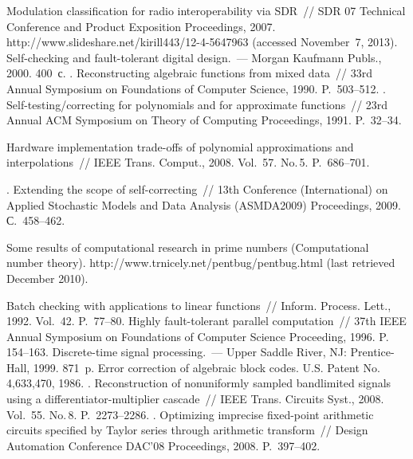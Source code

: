   \begin{multicols}{2}

\renewcommand{\bibname}{\protect\rmfamily Литература}

{\small\frenchspacing
{%
\begin{thebibliography}{99}

Modulation classification for radio interoperability via SDR~// {SDR 07 Technical Conference and Product Exposition 
Proceedings},  2007. {\sf http://www.slideshare.net/kirill443/12-4-5647963} (accessed November~7, 2013).
 Self-checking and fault-tolerant digital design.~--- Morgan Kaufmann Publs., 2000.
400~с.
.  Reconstructing algebraic functions from mixed data~// {33rd Annual 
Symposium on Foundations of Computer Science}, 1990. P.~503--512.
.
Self-testing/correcting for polynomials and for approximate functions~// {23rd Annual ACM Symposium on Theory of Computing 
Proceedings},  1991. P.~32--34.

  Hardware implementation trade-offs of polynomial approximations and 
interpolations~// {IEEE Trans. Comput.}, 2008.  Vol.~57. No.\,5. P.~686--701.

.  Extending the scope of self-correcting~// {13th 
Conference (International) on Applied Stochastic Models 
and Data Analysis (ASMDA2009)  Proceedings}, 2009.  С.~458--462.

 {Some results of computational research in prime numbers (Computational number theory)}.
{\sf  http://www.trnicely.net/pentbug/pentbug.html} (last retrieved December 2010).

 Batch checking with applications to linear functions~// 
{Inform. Process. Lett.}, 1992. Vol.~42. P.~77--80.
 Highly fault-tolerant parallel computation~// {37th IEEE  Annual Symposium on Foundations of Computer 
Science Proceeding}, 1996. P.~ 154--163.
  {Discrete-time signal processing}.~--- Upper Saddle River, NJ: Prentice-
Hall, 1999. 871~p.
  Error correction  of algebraic block codes. U.S. Patent No.\,4,633,470, 1986. 
.  Reconstruction of nonuniformly sampled bandlimited  signals using a 
differentiator-multiplier cascade~// {IEEE Trans. Circuits  Syst.}, 2008. Vol.~55. No.\,8. P.~2273--2286.
.  Optimizing imprecise fixed-point arithmetic circuits specified by Taylor series through arithmetic 
transform~// {Design Automation Conference  DAC'08 Proceedings}, 2008.  P.~397--402.


\end{thebibliography}}}
\end{multicols}
